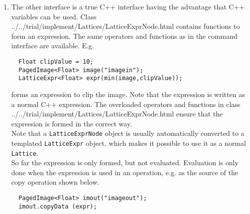 \begin{itemize}
\begin{enumerate}
  \item
    The other interface is a true C++ interface having the
    advantage that C++ variables can be used. Class
    {../../trial/implement/Lattices/LatticeExprNode.html}
    contains functions to form an expression. The same operators
    and functions as in the command interface are available.
    E.g.
\begin{verbatim}
  Float clipValue = 10;
  PagedImage<Float> image("imagein");
  LatticeExpr<Float> expr(min(image,clipValue));
\end{verbatim}
    forms an expression to clip the image. Note that the expression is
    written as a normal C++ expression. The overloaded operators and
    functions in class 
    {../../trial/implement/Lattices/LatticeExprNode.html}
    ensure that the expression is formed in the correct way.
    \\Note that a \texttt{LatticeExprNode} object is usually
    automatically converted to a templated \texttt{LatticeExpr} object,
    which makes it possible to use it as a normal \texttt{Lattice}.
    \\So far the expression is only formed, but not evaluated.
    Evaluation is only done when the expression is used in an
    operation, e.g. as the source of the copy operation shown below.
\begin{verbatim}
  PagedImage<Float> imout("imageout");
  imout.copyData (expr);
\end{verbatim}

  \end{enumerate}
\end{itemize}

